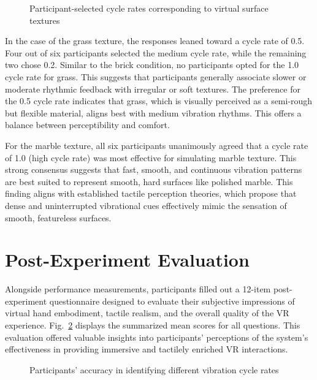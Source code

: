 \begin{figure}[H]\centering
	
	\caption{Participant-selected cycle rates corresponding to virtual surface textures}\label{fig:ex2_results}
\end{figure}

In the case of the grass texture, the responses leaned toward a cycle rate of 0.5. Four out of six participants selected the medium cycle rate, while the remaining two chose 0.2. Similar to the brick condition, no participants opted for the 1.0 cycle rate for grass. This suggests that participants generally associate slower or moderate rhythmic feedback with irregular or soft textures. The preference for the 0.5 cycle rate indicates that grass, which is visually perceived as a semi-rough but flexible material, aligns best with medium vibration rhythms. This offers a balance between perceptibility and comfort.

For the marble texture, all six participants unanimously agreed that a cycle rate of 1.0 (high cycle rate) was most effective for simulating marble texture. This strong consensus suggests that fast, smooth, and continuous vibration patterns are best suited to represent smooth, hard surfaces like polished marble. This finding aligns with established tactile perception theories, which propose that dense and uninterrupted vibrational cues effectively mimic the sensation of smooth, featureless surfaces.


\section{Post-Experiment Evaluation}
Alongside performance measurements, participants filled out a 12-item post-experiment questionnaire designed to evaluate their subjective impressions of virtual hand embodiment, tactile realism, and the overall quality of the VR experience. Fig.~\ref{fig:questionnaire_results} displays the summarized mean scores for all questions. This evaluation offered valuable insights into participants' perceptions of the system's effectiveness in providing immersive and tactilely enriched VR interactions.

\begin{figure}[H]\centering
	
	\caption{Participants' accuracy in identifying different vibration cycle rates}\label{fig:questionnaire_results}
\end{figure}

